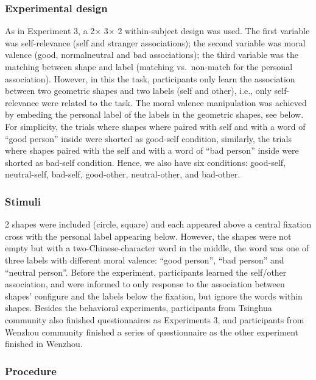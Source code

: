 \documentclass[man]{apa6}
\begin{document}
\hypertarget{experimental-design}{%
\subsubsection{Experimental design}\label{experimental-design}}

As in Experiment 3, a 2× 3× 2 within-subject design was used. The first variable was self-relevance (self and stranger associations); the second variable was moral valence (good, normalneutral and bad associations); the third variable was the matching between shape and label (matching vs.~non-match for the personal association).
However, in this the task, participants only learn the association between two geometric shapes and two labels (self and other), i.e., only self-relevance were related to the task. The moral valence manipulation was achieved by embeding the personal label of the labels in the geometric shapes, see below. For simplicity, the trials where shapes where paired with self and with a word of \enquote{good person} inside were shorted as good-self condition, similarly, the trials where shapes paired with the self and with a word of \enquote{bad person} inside were shorted as bad-self condition. Hence, we also have six conditions: good-self, neutral-self, bad-self, good-other, neutral-other, and bad-other.

\hypertarget{stimuli-1}{%
\subsubsection{Stimuli}\label{stimuli-1}}

2 shapes were included (circle, square) and each appeared above a central fixation cross with the personal label appearing below. However, the shapes were not empty but with a two-Chinese-character word in the middle, the word was one of three labels with different moral valence: \enquote{good person}, \enquote{bad person} and \enquote{neutral person}. Before the experiment, participants learned the self/other association, and were informed to only response to the association between shapes' configure and the labels below the fixation, but ignore the words within shapes. Besides the behavioral experiments, participants from Tsinghua community also finished questionnaires as Experiments 3, and participants from Wenzhou community finished a series of questionnaire as the other experiment finished in Wenzhou.

\hypertarget{procedure-6}{%
\subsubsection{Procedure}\label{procedure-6}}
\end{document}

